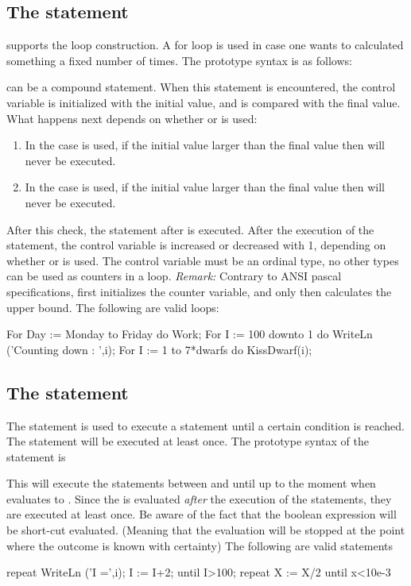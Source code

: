 \documentclass{report}
\begin{document}
\subsection{The  statement}
\fpc supports the  loop construction. A for loop is used in case
one wants to calculated something a fixed number of times. 
The prototype syntax is as follows:

 can be a compound statement. 
When this statement is encountered, the control variable is initialized with
the initial value, and is compared with the final value.
What happens next depends on whether  or  is used:
\begin{enumerate}
\item In the case  is used, if the initial value larger than the final 
value then  will never be executed. 
\item In the case  is used, if the initial value larger than the final 
value then  will never be executed. 
\end{enumerate}
After this check, the statement after  is executed. After the
execution of the statement, the control variable is increased or decreased
with 1, depending on whether  or  is used.
The control variable must be an ordinal type, no other 
types can be used as counters in a loop.
{\em Remark:} Contrary to ANSI pascal specifications, \fpc first initializes
the counter variable, and only then calculates the upper bound.
The following are valid loops:
\begin{listing}
For Day := Monday to Friday do Work;
For I := 100 downto 1 do
  WriteLn ('Counting down : ',i);
For I := 1 to 7*dwarfs do KissDwarf(i); 
\end{listing}
\subsection{The  statement}
The  statement is used to execute a statement until a certain
condition is reached. The statement will be executed at least once.
The prototype syntax of the  statement is

This will execute the statements between  and {until} up to
the moment when  evaluates to . 
Since the  is evaluated {\em after} the execution of the
statements, they are executed at least once.
Be aware of the fact that the boolean expression  will be 
short-cut evaluated. (Meaning that the evaluation will be stopped at the 
point where the outcome is known with certainty)
The following are valid  statements
\begin{listing}
repeat
  WriteLn ('I =',i);
  I := I+2;
until I>100;
repeat
 X := X/2
until x<10e-3
\end{listing}
\end{document}
